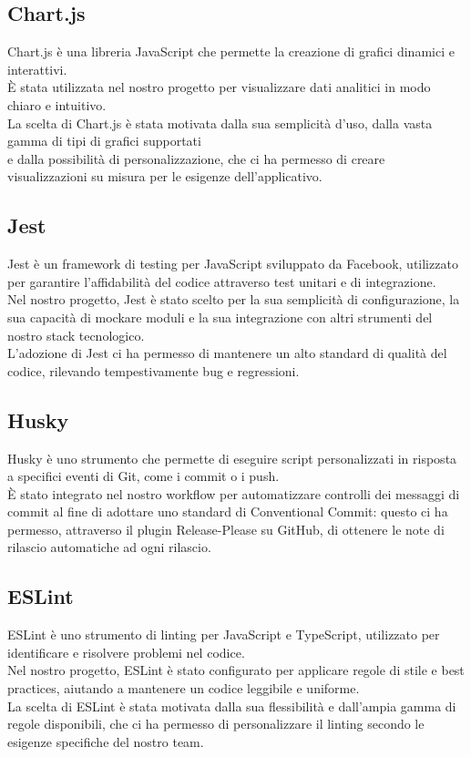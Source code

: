 \subsection{Chart.js}
Chart.js è una libreria JavaScript che permette la creazione di grafici dinamici e interattivi.\\
È stata utilizzata nel nostro progetto per visualizzare dati analitici in modo chiaro e intuitivo.\\
La scelta di Chart.js è stata motivata dalla sua semplicità d'uso, dalla vasta gamma di tipi di grafici supportati\\
e dalla possibilità di personalizzazione, che ci ha permesso di creare visualizzazioni su misura per le esigenze dell'applicativo.

\subsection{Jest}
Jest è un framework di testing per JavaScript sviluppato da Facebook, utilizzato per garantire l'affidabilità del
codice attraverso test unitari e di integrazione.\\
Nel nostro progetto, Jest è stato scelto per la sua semplicità di configurazione, la sua capacità
di mockare moduli e la sua integrazione con altri strumenti del nostro stack tecnologico.\\
L'adozione di Jest ci ha permesso di mantenere un alto standard di qualità del codice, rilevando tempestivamente bug e regressioni.

\subsection{Husky}
Husky è uno strumento che permette di eseguire script personalizzati in risposta a specifici eventi di Git,
come i commit o i push.\\ È stato integrato nel nostro workflow per automatizzare controlli dei messaggi di commit
al fine di adottare uno standard di Conventional Commit: questo ci ha permesso, attraverso il plugin Release-Please su GitHub, di ottenere le note di rilascio automatiche ad ogni rilascio.

\subsection{ESLint}
ESLint è uno strumento di linting per JavaScript e TypeScript, utilizzato per identificare e risolvere problemi nel codice.\\
Nel nostro progetto, ESLint è stato configurato per applicare regole di stile e best practices, aiutando a mantenere un
codice leggibile e uniforme.\\ La scelta di ESLint è stata motivata dalla sua flessibilità e dall'ampia gamma di regole
disponibili, che ci ha permesso di personalizzare il linting secondo le esigenze specifiche del nostro team.
